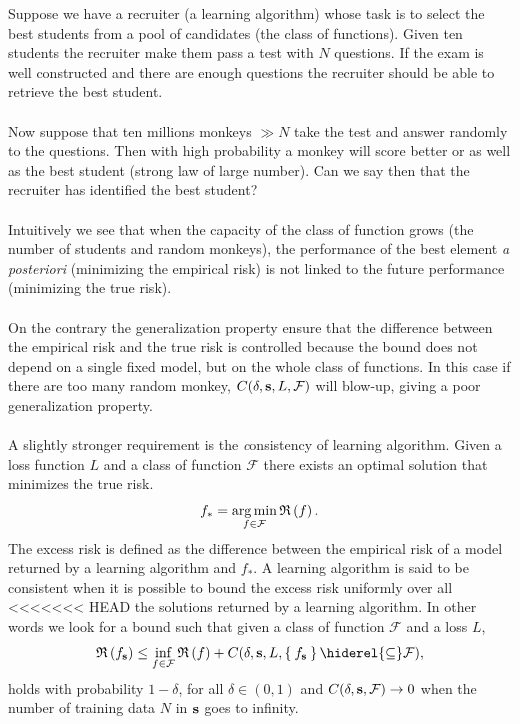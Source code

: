 \begin{example}
    Suppose we have a recruiter (a learning algorithm) whose task is to select 
    the best students from a pool of candidates (the class of functions).
    Given ten students the recruiter make them pass a test with $N$ questions.
    If the exam is well constructed and there are enough questions the
    recruiter should be able to retrieve the best student.
    \paragraph{}
    Now suppose that ten millions monkeys $\gg N$ take the test and answer
    randomly to the questions. Then with high probability a monkey will score
    better or as well as the best student (strong law of large number). Can we
    say then that the recruiter has identified the best
    student?
    \paragraph{}
    Intuitively we see that when the capacity of the class of function grows
    (the number of students and random monkeys), the performance of the best
    element \emph{a posteriori} (minimizing the empirical risk) is not linked
    to the future performance (minimizing the true risk).
    \paragraph{}
    On the contrary the generalization property ensure that the difference
    between the empirical risk and the true risk is controlled because the bound
    does not depend on a single fixed model, but on the whole class of
    functions. In this case if there are too many random monkey, $C(\delta,
    \boldsymbol{\mathbf{s}}, L, \mathcal{F})$ will blow-up, giving a poor generalization
    property.
\end{example}
\paragraph{}
A slightly stronger requirement is the {\emph consistency} of learning algorithm.
Given a loss function $L$ and a class of function $\mathcal{F}$ there exists an
optimal solution that minimizes the true risk.
\begin{dmath*}
    f_* = \argmin_{f\in\mathcal{F}} \risk{f}.
\end{dmath*}
The excess risk is defined as the difference between the empirical risk of a
model returned by a learning algorithm and $f_*$. A learning algorithm is said to be
consistent when it is possible to bound the excess risk uniformly over all
<<<<<<< HEAD
the solutions returned by a learning algorithm. In other words we look for a
bound such that given a class of function $\mathcal{F}$ and a loss $L$,
\begin{dmath*}
    \risk{f_{\seq{s}}} \le \inf_{f\in\mathcal{F}} \risk{f} + C(\delta, \seq{s},
    L, \Set{f_{\seq{s}}}\hiderel{\subseteq}\mathcal{F}),
\end{dmath*}
holds with probability $1 - \delta$, for all $\delta \in (0, 1)$  and
$C(\delta, \boldsymbol{\mathbf{s}}, \mathcal{F}) \to 0$ when the number of training data $N$ in
$\boldsymbol{\mathbf{s}}$ goes to infinity. 
